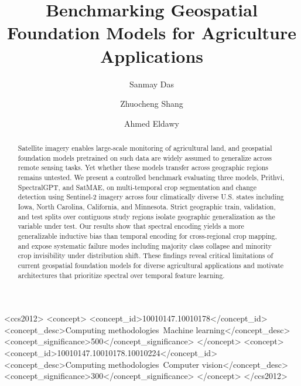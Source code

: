 \documentclass[sigconf]{acmart}
\begin{document}
\title{Benchmarking Geospatial Foundation Models for Agriculture Applications}

\author{Sanmay Das}

\author{Zhuocheng Shang}

\author{Ahmed Eldawy}

\renewcommand{\shortauthors}{Das and Eldawy}

\begin{abstract}
Satellite imagery enables large-scale monitoring of agricultural land, and geospatial foundation models pretrained on such data are widely assumed to generalize across remote sensing tasks. Yet whether these models transfer across geographic regions
remains untested. We present a controlled benchmark evaluating three models, Prithvi, SpectralGPT, and SatMAE, on multi-temporal crop segmentation and change detection  using Sentinel-2 imagery across four climatically diverse U.S. states including Iowa, North Carolina, California, and Minnesota. Strict geographic train, validation, and test splits over contiguous study regions isolate geographic generalization as the variable under test. Our results show that spectral encoding yields a more generalizable inductive
bias than temporal encoding for cross-regional crop mapping, and expose systematic  failure modes including majority class collapse and minority crop invisibility under distribution shift. These findings reveal critical limitations of current geospatial foundation models for diverse agricultural applications and motivate architectures that prioritize spectral over temporal feature learning.
\end{abstract}

\begin{CCSXML}
<ccs2012>
 <concept>
  <concept_id>10010147.10010178</concept_id>
  <concept_desc>Computing methodologies~Machine learning</concept_desc>
  <concept_significance>500</concept_significance>
 </concept>
 <concept>
  <concept_id>10010147.10010178.10010224</concept_id>
  <concept_desc>Computing methodologies~Computer vision</concept_desc>
  <concept_significance>300</concept_significance>
 </concept>
</ccs2012>
\end{CCSXML}
\end{document}
